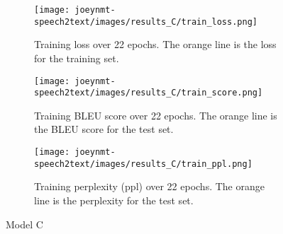 \documentclass[11pt,a4paper]{article}
\begin{document}
\begin{figure*}[ht]
    \begin{subfigure}[b]{0.32\textwidth}
        \centering
        \texttt{[image: joeynmt-speech2text/images/results\_C/train\_loss.png]}
        \caption{Training loss over 22 epochs. The orange line is the loss for the training set.}
        \label{fig:train_loss_c}
    \end{subfigure}
    \hfill
    \begin{subfigure}[b]{0.32\textwidth}
        \centering
        \texttt{[image: joeynmt-speech2text/images/results\_C/train\_score.png]}
        \caption{Training BLEU score over 22 epochs. The orange line is the BLEU score for the test set.}
        \label{fig:train_score_c}
    \end{subfigure}
    \hfill
    \begin{subfigure}[b]{0.32\textwidth}
        \centering
        \texttt{[image: joeynmt-speech2text/images/results\_C/train\_ppl.png]}
        \caption{Training perplexity (ppl) over 22 epochs. The orange line is the perplexity for the test set.}
        \label{fig:train_ppl_c}
    \end{subfigure}
    \caption{Model C}
    \label{fig:model_c_loss_ppl_score}
\end{figure*}
\end{document}
